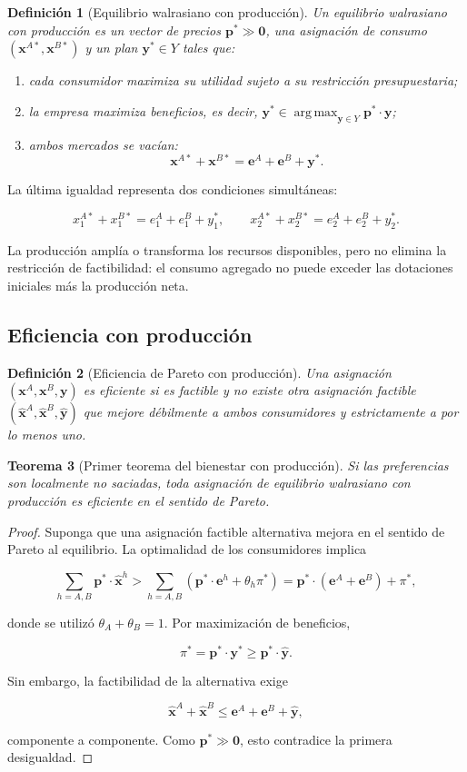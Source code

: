 \documentclass[12pt]{article}
\theoremstyle{cideplain}
\newtheorem{theorem}{Teorema}[section]
\theoremstyle{cidedef}
\newtheorem{definition}[theorem]{Definición}
\DeclareMathOperator*{\argmax}{arg\,max}
\newcommand{\p}{\bm p}
\newcommand{\e}{\bm e}
\newcommand{\x}{\bm x}
\newcommand{\y}{\bm y}
\begin{document}
\begin{definition}[Equilibrio walrasiano con producción]
Un equilibrio walrasiano con producción es un vector de precios
\(\p^*\gg\bm 0\), una asignación de consumo
\((\x^{A*},\x^{B*})\) y un plan \(\y^*\in Y\) tales que:

\begin{enumerate}
  \item cada consumidor maximiza su utilidad sujeto a su restricción presupuestaria;
  \item la empresa maximiza beneficios, es decir,
  \(\y^*\in\argmax_{\y\in Y}\p^*\cdot\y\);
  \item ambos mercados se vacían:
  \[
    \x^{A*}+\x^{B*}
    =
    \e^A+\e^B+\y^*.
  \]
\end{enumerate}
\end{definition}

La última igualdad representa dos condiciones simultáneas:

\[
  x_1^{A*}+x_1^{B*}=e_1^A+e_1^B+y_1^*,
  \qquad
  x_2^{A*}+x_2^{B*}=e_2^A+e_2^B+y_2^*.
\]

La producción amplía o transforma los recursos disponibles, pero no elimina la restricción
de factibilidad: el consumo agregado no puede exceder las dotaciones iniciales más la
producción neta.

\subsection{Eficiencia con producción}

\begin{definition}[Eficiencia de Pareto con producción]
Una asignación \((\x^A,\x^B,\y)\) es eficiente si es factible y no existe otra asignación
factible \((\widehat{\x}^A,\widehat{\x}^B,\widehat{\y})\) que mejore débilmente a ambos
consumidores y estrictamente a por lo menos uno.
\end{definition}

\begin{theorem}[Primer teorema del bienestar con producción]
Si las preferencias son localmente no saciadas, toda asignación de equilibrio walrasiano
con producción es eficiente en el sentido de Pareto.
\end{theorem}

\begin{proof}
Suponga que una asignación factible alternativa mejora en el sentido de Pareto al
equilibrio. La optimalidad de los consumidores implica

\[
  \sum_{h=A,B}\p^*\cdot\widehat{\x}^{h}
  >
  \sum_{h=A,B}
  \left(\p^*\cdot\e^h+\theta_h\pi^*\right)
  =
  \p^*\cdot(\e^A+\e^B)+\pi^*,
\]

donde se utilizó \(\theta_A+\theta_B=1\). Por maximización de beneficios,

\[
  \pi^*=\p^*\cdot\y^*
  \geq
  \p^*\cdot\widehat{\y}.
\]

Sin embargo, la factibilidad de la alternativa exige

\[
  \widehat{\x}^{A}+\widehat{\x}^{B}
  \leq
  \e^A+\e^B+\widehat{\y},
\]

componente a componente. Como \(\p^*\gg\bm 0\), esto contradice la primera desigualdad.
\end{proof}
\end{document}
